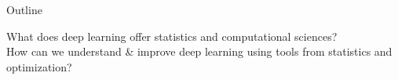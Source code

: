 \documentclass[11pt,xcolor=x11names,aspectratio=169]{beamer}
\def\customfootlinetext{}
\begin{document}





\begin{frame}{Outline}

What does deep learning offer statistics and computational sciences?  \\How can we understand \& improve deep learning using tools from statistics and optimization?
\end{frame}
\end{document}
